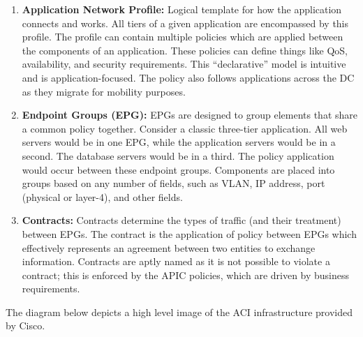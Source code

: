 \begin{enumerate}
  \item \textbf{Application Network Profile:} Logical template for how the
  application connects and works. All tiers of a given application are
  encompassed by this profile. The profile can contain multiple policies which
  are applied between the components of an application. These policies can
  define things like QoS, availability, and security requirements. This
  ``declarative'' model is intuitive and is application-focused. The policy
  also follows applications across the DC as they migrate for mobility purposes.
  \item \textbf{Endpoint Groups (EPG):} EPGs are designed to group elements
  that share a common policy together. Consider a classic three-tier
  application. All web servers would be in one EPG, while the application
  servers would be in a second. The database servers would be in a third. The
  policy application would occur between these endpoint groups. Components are
  placed into groups based on any number of fields, such as VLAN, IP address,
  port (physical or layer-4), and other fields.
  \item \textbf{Contracts:} Contracts determine the types of traffic (and
  their treatment) between EPGs. The contract is the application of policy
  between EPGs which effectively represents an agreement between two entities
  to exchange information. Contracts are aptly named as it is not possible to
  violate a contract; this is enforced by the APIC policies, which are driven
  by business requirements.
\end{enumerate}

The diagram below depicts a high level image of the ACI infrastructure provided by Cisco.

